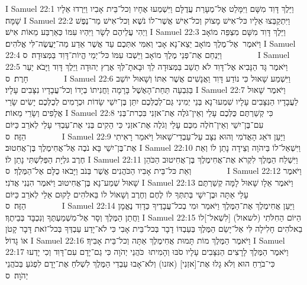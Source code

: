 I Samuel 22:1	וַיֵּלֶךְ דָּוִד מִשָּׁם וַיִּמָּלֵט אֶל־מְעָרַת עֲדֻלָּם וַיִּשְׁמְעוּ אֶחָיו וְכל־בֵּית אָבִיו וַיֵּרְדוּ אֵלָיו שָׁמָּה׃
I Samuel 22:2	וַיִּתְקַבְּצוּ אֵלָיו כּל־אִישׁ מָצוֹק וְכל־אִישׁ אֲשֶׁר־לוֹ נֹשֶׁא וְכל־אִישׁ מַר־נֶפֶשׁ וַיְהִי עֲלֵיהֶם לְשָׂר וַיִּהְיוּ עִמּוֹ כְּאַרְבַּע מֵאוֹת אִישׁ׃
I Samuel 22:3	וַיֵּלֶךְ דָּוִד מִשָּׁם מִצְפֵּה מוֹאָב וַיֹּאמֶר  אֶל־מֶלֶךְ מוֹאָב יֵצֵא־נָא אָבִי וְאִמִּי אִתְּכֶם עַד אֲשֶׁר אֵדַע מַה־יַּעֲשֶׂה־לִּי אֱלֹהִים׃
I Samuel 22:4	וַיַּנְחֵם אֶת־פְּנֵי מֶלֶךְ מוֹאָב וַיֵּשְׁבוּ עִמּוֹ כּל־יְמֵי הֱיוֹת־דָּוִד בַּמְּצוּדָה׃ {ס}        
I Samuel 22:5	וַיֹּאמֶר גָּד הַנָּבִיא אֶל־דָּוִד לֹא תֵשֵׁב בַּמְּצוּדָה לֵךְ וּבָאתָ־לְּךָ אֶרֶץ יְהוּדָה וַיֵּלֶךְ דָּוִד וַיָּבֹא יַעַר חָרֶת׃ {ס}        
I Samuel 22:6	וַיִּשְׁמַע שָׁאוּל כִּי נוֹדַע דָּוִד וַאֲנָשִׁים אֲשֶׁר אִתּוֹ וְשָׁאוּל יוֹשֵׁב בַּגִּבְעָה תַּחַת־הָאֶשֶׁל בָּרָמָה וַחֲנִיתוֹ בְיָדוֹ וְכל־עֲבָדָיו נִצָּבִים עָלָיו׃
I Samuel 22:7	וַיֹּאמֶר שָׁאוּל לַעֲבָדָיו הַנִּצָּבִים עָלָיו שִׁמְעוּ־נָא בְּנֵי יְמִינִי גַּם־לְכֻלְּכֶם יִתֵּן בֶּן־יִשַׁי שָׂדוֹת וּכְרָמִים לְכֻלְּכֶם יָשִׂים שָׂרֵי אֲלָפִים וְשָׂרֵי מֵאוֹת׃
I Samuel 22:8	כִּי קְשַׁרְתֶּם כֻּלְּכֶם עָלַי וְאֵין־גֹּלֶה אֶת־אזְנִי בִּכְרת־בְּנִי עִם־בֶּן־יִשַׁי וְאֵין־חֹלֶה מִכֶּם עָלַי וְגֹלֶה אֶת־אזְנִי כִּי הֵקִים בְּנִי אֶת־עַבְדִּי עָלַי לְאֹרֵב כַּיּוֹם הַזֶּה׃ {ס}        
I Samuel 22:9	וַיַּעַן דֹּאֵג הָאֲדֹמִי וְהוּא נִצָּב עַל־עַבְדֵי־שָׁאוּל וַיֹּאמַר רָאִיתִי אֶת־בֶּן־יִשַׁי בָּא נֹבֶה אֶל־אֲחִימֶלֶךְ בֶּן־אֲחִטוּב׃
I Samuel 22:10	וַיִּשְׁאַל־לוֹ בַּיהֹוָה וְצֵידָה נָתַן לוֹ וְאֵת חֶרֶב גּלְיָת הַפְּלִשְׁתִּי נָתַן לוֹ׃
I Samuel 22:11	וַיִּשְׁלַח הַמֶּלֶךְ לִקְרֹא אֶת־אֲחִימֶלֶךְ בֶּן־אֲחִיטוּב הַכֹּהֵן וְאֵת כּל־בֵּית אָבִיו הַכֹּהֲנִים אֲשֶׁר בְּנֹב וַיָּבֹאוּ כֻלָּם אֶל־הַמֶּלֶךְ׃ {ס}        
I Samuel 22:12	וַיֹּאמֶר שָׁאוּל שְׁמַע־נָא בֶּן־אֲחִיטוּב וַיֹּאמֶר הִנְנִי אֲדֹנִי׃
I Samuel 22:13	וַיֹּאמֶר אֵלָו שָׁאוּל לָמָּה קְשַׁרְתֶּם עָלַי אַתָּה וּבֶן־יִשָׁי בְּתִתְּךָ לוֹ לֶחֶם וְחֶרֶב וְשָׁאוֹל לוֹ בֵּאלֹהִים לָקוּם אֵלַי לְאֹרֵב כַּיּוֹם הַזֶּה׃ {ס}        
I Samuel 22:14	וַיַּעַן אֲחִימֶלֶךְ אֶת־הַמֶּלֶךְ וַיֹּאמַר וּמִי בְכל־עֲבָדֶיךָ כְּדָוִד נֶאֱמָן וַחֲתַן הַמֶּלֶךְ וְסָר אֶל־מִשְׁמַעְתֶּךָ וְנִכְבָּד בְּבֵיתֶךָ׃
I Samuel 22:15	הַיּוֹם הַחִלֹּתִי (לשאול) [לִשְׁאל־]לוֹ בֵאלֹהִים חָלִילָה לִּי אַל־יָשֵׂם הַמֶּלֶךְ בְּעַבְדּוֹ דָבָר בְּכל־בֵּית אָבִי כִּי לֹא־יָדַע עַבְדְּךָ בְּכל־זֹאת דָּבָר קָטֹן אוֹ גָדוֹל׃
I Samuel 22:16	וַיֹּאמֶר הַמֶּלֶךְ מוֹת תָּמוּת אֲחִימֶלֶךְ אַתָּה וְכל־בֵּית אָבִיךָ׃
I Samuel 22:17	וַיֹּאמֶר הַמֶּלֶךְ לָרָצִים הַנִּצָּבִים עָלָיו סֹבּוּ וְהָמִיתוּ  כֹּהֲנֵי יְהֹוָה כִּי גַם־יָדָם עִם־דָּוִד וְכִי יָדְעוּ כִּי־בֹרֵחַ הוּא וְלֹא גָלוּ אֶת־[אזְנִי] (אזנו) וְלֹא־אָבוּ עַבְדֵי הַמֶּלֶךְ לִשְׁלֹחַ אֶת־יָדָם לִפְגֹעַ בְּכֹהֲנֵי יְהֹוָה׃ {ס}        
